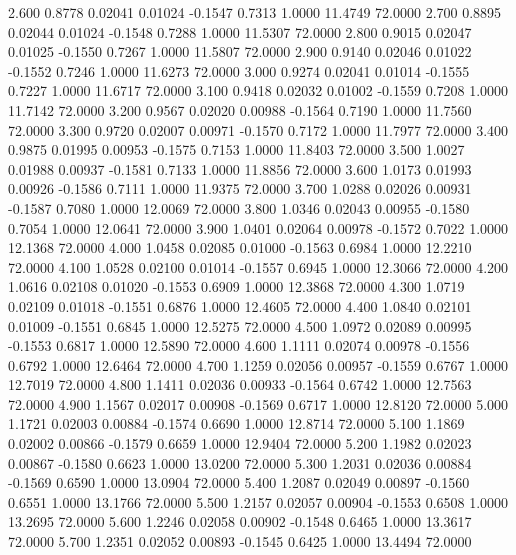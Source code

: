    2.600   0.8778   0.02041   0.01024  -0.1547   0.7313   1.0000  11.4749  72.0000
   2.700   0.8895   0.02044   0.01024  -0.1548   0.7288   1.0000  11.5307  72.0000
   2.800   0.9015   0.02047   0.01025  -0.1550   0.7267   1.0000  11.5807  72.0000
   2.900   0.9140   0.02046   0.01022  -0.1552   0.7246   1.0000  11.6273  72.0000
   3.000   0.9274   0.02041   0.01014  -0.1555   0.7227   1.0000  11.6717  72.0000
   3.100   0.9418   0.02032   0.01002  -0.1559   0.7208   1.0000  11.7142  72.0000
   3.200   0.9567   0.02020   0.00988  -0.1564   0.7190   1.0000  11.7560  72.0000
   3.300   0.9720   0.02007   0.00971  -0.1570   0.7172   1.0000  11.7977  72.0000
   3.400   0.9875   0.01995   0.00953  -0.1575   0.7153   1.0000  11.8403  72.0000
   3.500   1.0027   0.01988   0.00937  -0.1581   0.7133   1.0000  11.8856  72.0000
   3.600   1.0173   0.01993   0.00926  -0.1586   0.7111   1.0000  11.9375  72.0000
   3.700   1.0288   0.02026   0.00931  -0.1587   0.7080   1.0000  12.0069  72.0000
   3.800   1.0346   0.02043   0.00955  -0.1580   0.7054   1.0000  12.0641  72.0000
   3.900   1.0401   0.02064   0.00978  -0.1572   0.7022   1.0000  12.1368  72.0000
   4.000   1.0458   0.02085   0.01000  -0.1563   0.6984   1.0000  12.2210  72.0000
   4.100   1.0528   0.02100   0.01014  -0.1557   0.6945   1.0000  12.3066  72.0000
   4.200   1.0616   0.02108   0.01020  -0.1553   0.6909   1.0000  12.3868  72.0000
   4.300   1.0719   0.02109   0.01018  -0.1551   0.6876   1.0000  12.4605  72.0000
   4.400   1.0840   0.02101   0.01009  -0.1551   0.6845   1.0000  12.5275  72.0000
   4.500   1.0972   0.02089   0.00995  -0.1553   0.6817   1.0000  12.5890  72.0000
   4.600   1.1111   0.02074   0.00978  -0.1556   0.6792   1.0000  12.6464  72.0000
   4.700   1.1259   0.02056   0.00957  -0.1559   0.6767   1.0000  12.7019  72.0000
   4.800   1.1411   0.02036   0.00933  -0.1564   0.6742   1.0000  12.7563  72.0000
   4.900   1.1567   0.02017   0.00908  -0.1569   0.6717   1.0000  12.8120  72.0000
   5.000   1.1721   0.02003   0.00884  -0.1574   0.6690   1.0000  12.8714  72.0000
   5.100   1.1869   0.02002   0.00866  -0.1579   0.6659   1.0000  12.9404  72.0000
   5.200   1.1982   0.02023   0.00867  -0.1580   0.6623   1.0000  13.0200  72.0000
   5.300   1.2031   0.02036   0.00884  -0.1569   0.6590   1.0000  13.0904  72.0000
   5.400   1.2087   0.02049   0.00897  -0.1560   0.6551   1.0000  13.1766  72.0000
   5.500   1.2157   0.02057   0.00904  -0.1553   0.6508   1.0000  13.2695  72.0000
   5.600   1.2246   0.02058   0.00902  -0.1548   0.6465   1.0000  13.3617  72.0000
   5.700   1.2351   0.02052   0.00893  -0.1545   0.6425   1.0000  13.4494  72.0000
